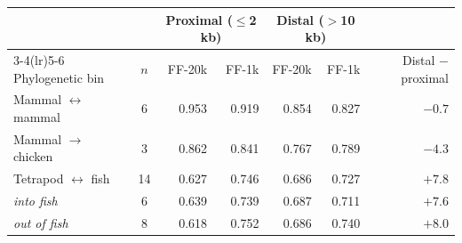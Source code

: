 \begin{tabular}{l c r r r r r}
\toprule
 & & \multicolumn{2}{c}{Proximal ($\leq$2 kb)} & \multicolumn{2}{c}{Distal ($>$10 kb)} & \\
\cmidrule(lr){3-4}\cmidrule(lr){5-6}
Phylogenetic bin & $n$ & FF-20k & FF-1k & FF-20k & FF-1k & Distal $-$ proximal \\
\midrule
 Mammal $\leftrightarrow$ mammal & 6 & 0.953 & 0.919 & 0.854 & 0.827 & $-0.7$ \\
 Mammal $\rightarrow$ chicken & 3 & 0.862 & 0.841 & 0.767 & 0.789 & $-4.3$ \\
 Tetrapod $\leftrightarrow$ fish & 14 & 0.627 & 0.746 & 0.686 & 0.727 & $+7.8$ \\
\itshape \quad into fish & 6 & 0.639 & 0.739 & 0.687 & 0.711 & $+7.6$ \\
\itshape \quad out of fish & 8 & 0.618 & 0.752 & 0.686 & 0.740 & $+8.0$ \\
\bottomrule
\end{tabular}
